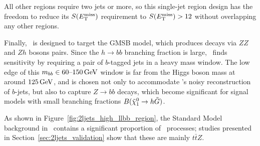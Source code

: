 
All other regions require two jets or more, so this single-jet region design
has the freedom to reduce its $\metsig$ requirement to $\metsig > 12$
without overlapping any other regions.

Finally, \srllbb\ is designed to target the GMSB model, which produces decays
via $ZZ$ and $Zh$ bosons pairs.
Since the $h\to bb$ branching fraction is large, \srllbb\ finds
sensitivity by requiring a pair of $b$-tagged jets in a heavy mass window.
The low edge of this $\mbb \in 60\textrm{--}150\,\eV[G]$ window is far from the
Higgs boson mass at around $125\,\eV[G]$, and is chosen not only to
accommodate \atlas's noisy reconstruction of $b$-jets, but also to
capture $Z\to bb$ decays, which become significant for signal models
with small branching fractions $B(\neutralino_1 \to h \gravitino)$.

As shown in Figure~\ref{fig:2ljets_high_llbb_region}, the Standard Model
background in \srllbb\ contains a significant proportion of \topother\
processes; studies presented in Section~\ref{sec:2ljets_validation} show that
these are mainly $t\bar t Z$.

